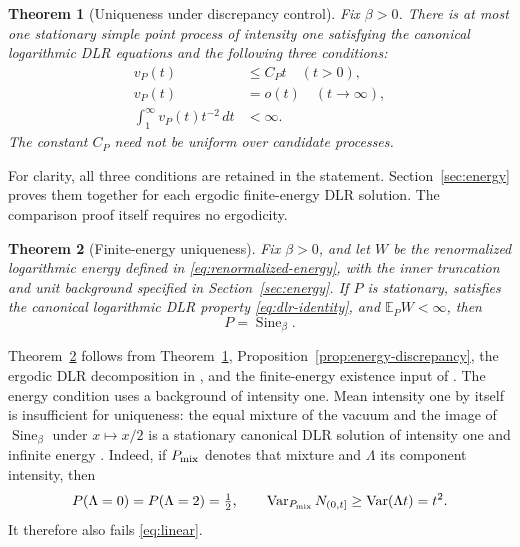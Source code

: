 \documentclass[11pt,reqno]{amsart}
\numberwithin{equation}{section}
\newtheorem{theorem}{Theorem}[section]
\theoremstyle{definition}
\theoremstyle{remark}
\newcommand{\E}{\mathbb E}
\newcommand{\1}{\mathbf 1}
\newcommand{\Var}{\operatorname{Var}}
\newcommand{\Sine}{\operatorname{Sine}}
\newcommand{\dd}{\,d}
\begin{document}
\begin{samepage}
\begin{theorem}[Uniqueness under discrepancy control]\label{thm:comparison}
Fix $\beta>0$. There is at most one stationary simple point process of
intensity one satisfying the canonical logarithmic DLR equations and the
following three conditions:
\begin{align}
v_P(t)&\le C_Pt \quad(t>0),\label{eq:linear}\\
v_P(t)&=o(t)\quad(t\to\infty),\label{eq:hyper}\\
\int_1^\infty v_P(t)t^{-2}\dd t&<\infty.\label{eq:integrated}
\end{align}
The constant $C_P$ need not be uniform over candidate processes.
\end{theorem}
\end{samepage}

For clarity, all three conditions are retained in the statement.
Section~\ref{sec:energy} proves them together for each ergodic finite-energy
DLR solution. The comparison proof itself requires no ergodicity.

\begin{samepage}
\begin{theorem}[Finite-energy uniqueness]\label{thm:finite-energy}
Fix $\beta>0$, and let $W$ be the renormalized logarithmic energy
defined in \eqref{eq:renormalized-energy}, with the inner truncation and
unit background specified in Section~\ref{sec:energy}.
If $P$ is stationary, satisfies the canonical logarithmic DLR
property \eqref{eq:dlr-identity}, and $\E_P W<\infty$, then
\[
P=\Sine_\beta.
\]
\end{theorem}
\end{samepage}

Theorem~\ref{thm:finite-energy} follows from
Theorem~\ref{thm:comparison}, Proposition~\ref{prop:energy-discrepancy},
the ergodic DLR decomposition in \cite[Proposition~3.13]{DHLM}, and the
finite-energy existence input of \cite[Corollary~1.2]{LS}.
The energy condition uses a background of intensity one. Mean intensity
one by itself is insufficient for uniqueness: the equal mixture of the
vacuum and the image of $\Sine_\beta$ under $x\mapsto x/2$ is a
stationary canonical DLR solution of intensity one and infinite energy
\cite[Proposition~9.4]{Assiotis}. Indeed, if $P_{\rm mix}$ denotes that mixture and $\Lambda$ its
component intensity, then
\[
P(\Lambda=0)=P(\Lambda=2)=\tfrac12,\qquad
\Var_{P_{\rm mix}}N_{(0,t]}
\ge\Var(\Lambda t)=t^2.
\]
It therefore also fails \eqref{eq:linear}.
\end{document}
